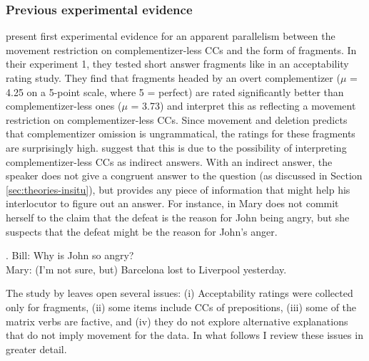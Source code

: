 \subsubsection{Previous experimental evidence}
\citet{merchant.etal2013} present first experimental evidence for an apparent parallelism between the movement restriction on complementizer-less CCs and the form of fragments. In their experiment 1, they tested short answer fragments like \Last[a] in an acceptability rating study. They find that fragments headed by an overt complementizer ($\mu$ = 4.25 on a 5-point scale, where 5 = perfect) are rated significantly better than complemen\-tizer-less ones ($\mu$  = 3.73) and interpret this as reflecting a movement restriction on comple\-mentizer-less CCs. Since movement and deletion predicts that complementizer omission is ungrammatical, the ratings for these fragments are surprisingly high. \citet{merchant.etal2013} suggest that this is due to the possibility of interpreting complementizer-less CCs as indirect answers. With an indirect answer, the speaker does not give a congruent answer to the question (as discussed in Section \ref{sec:theories-insitu}), but provides any piece of information that might help his interlocutor to figure out an answer. For instance, in \Next Mary does not commit herself to the claim that the defeat is the reason for John being angry, but she suspects that the defeat might be the reason for John's anger.

\ex. Bill: Why is John so angry?\\
    Mary: (I'm not sure, but) Barcelona lost to Liverpool yesterday.
    
The study by \citet{merchant.etal2013} leaves open several issues: (i) Acceptability ratings were collected only for fragments,  (ii) some items include CCs of prepositions, (iii) some of the matrix verbs are factive, and (iv) they do not explore alternative explanations that do not imply movement for the data. In what follows I review these issues in greater detail.

